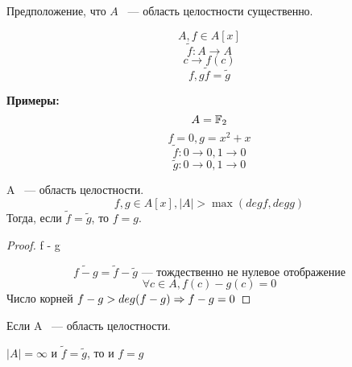 \begin{Rem}
Предположение, что $A$ ~--- область целостности существенно.  
\end{Rem}

\begin{Def}
$$A, f \in A[x]$$
$$\tilde f: A \to A$$
$$c \to f(c)$$
$$f, g \tilde f = \tilde g$$
\end{Def}
{\bf Примеры:}
$$A = \mathbb{F}_2$$
$$f = 0, g = x^2 + x$$
$$ \tilde f: 0 \to 0, 1 \to 0$$
$$ \tilde g: 0 \to 0, 1 \to 0$$

\begin{conseq}
A ~--- область целостности.
$$f, g \in A[x], |A| > \max(deg f, deg g)$$
Тогда, если $\tilde f = \tilde g$, то $f = g$.
\end{conseq}
\begin{proof}
f - g

$$\tilde{f - g} = \tilde f - \tilde g \text{~--- тождественно не нулевое отображение}$$
$$\forall c \in A, f(c) - g(c) = 0$$
Число корней $f - g > deg(f - g) \Rightarrow f - g = 0$
\end{proof}

\begin{conseq}
Если A ~--- область целостности.

$|A| = \infty$ и $\tilde f = \tilde g$, то и $f = g$
\end{conseq}